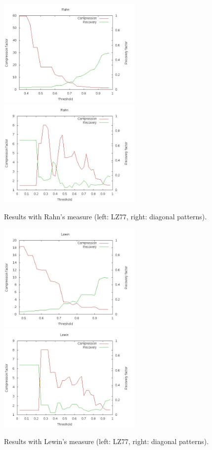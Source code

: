 \documentclass[a4paper,10pt]{article}
\begin{document}
\begin{figure}[h!]
\centering
\includegraphics[width=7cm]{images/Rahn77.jpg}\hspace{0.5cm}
\includegraphics[width=7cm]{images/RahnDiag.jpg}
\caption{Results with Rahn's measure (left: LZ77, right: diagonal patterns).\label{rahn}}
\end{figure}

\begin{figure}[h!]
\centering
\includegraphics[width=7cm]{images/Lewin77.jpg}\hspace{0.5cm}
\includegraphics[width=7cm]{images/LewinDiag.jpg}
\caption{Results with Lewin's measure (left: LZ77, right: diagonal patterns).\label{lewin}}
\end{figure}
\end{document}
